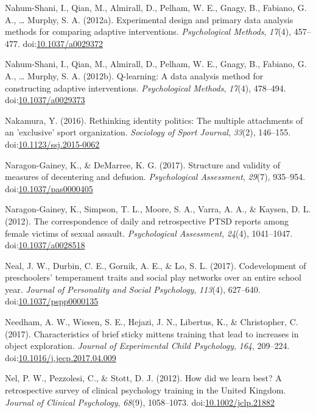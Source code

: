 \documentclass[english,man]{apa6}
\begin{document}
\hypertarget{ref-Nahum-Shani2012a}{}
Nahum-Shani, I., Qian, M., Almirall, D., Pelham, W. E., Gnagy, B.,
Fabiano, G. A., \ldots{} Murphy, S. A. (2012a). Experimental design and
primary data analysis methods for comparing adaptive interventions.
\emph{Psychological Methods}, \emph{17}(4), 457--477.
doi:\href{https://doi.org/10.1037/a0029372}{10.1037/a0029372}

\hypertarget{ref-Nahum-Shani2012}{}
Nahum-Shani, I., Qian, M., Almirall, D., Pelham, W. E., Gnagy, B.,
Fabiano, G. A., \ldots{} Murphy, S. A. (2012b). Q-learning: A data
analysis method for constructing adaptive interventions.
\emph{Psychological Methods}, \emph{17}(4), 478--494.
doi:\href{https://doi.org/10.1037/a0029373}{10.1037/a0029373}

\hypertarget{ref-Nakamura2016}{}
Nakamura, Y. (2016). Rethinking identity politics: The multiple
attachments of an 'exclusive' sport organization. \emph{Sociology of
Sport Journal}, \emph{33}(2), 146--155.
doi:\href{https://doi.org/10.1123/ssj.2015-0062}{10.1123/ssj.2015-0062}

\hypertarget{ref-Naragon-Gainey2017}{}
Naragon-Gainey, K., \& DeMarree, K. G. (2017). Structure and validity of
measures of decentering and defusion. \emph{Psychological Assessment},
\emph{29}(7), 935--954.
doi:\href{https://doi.org/10.1037/pas0000405}{10.1037/pas0000405}

\hypertarget{ref-Naragon-Gainey2012}{}
Naragon-Gainey, K., Simpson, T. L., Moore, S. A., Varra, A. A., \&
Kaysen, D. L. (2012). The correspondence of daily and retrospective PTSD
reports among female victims of sexual assault. \emph{Psychological
Assessment}, \emph{24}(4), 1041--1047.
doi:\href{https://doi.org/10.1037/a0028518}{10.1037/a0028518}

\hypertarget{ref-Neal2017}{}
Neal, J. W., Durbin, C. E., Gornik, A. E., \& Lo, S. L. (2017).
Codevelopment of preschoolers' temperament traits and social play
networks over an entire school year. \emph{Journal of Personality and
Social Psychology}, \emph{113}(4), 627--640.
doi:\href{https://doi.org/10.1037/pspp0000135}{10.1037/pspp0000135}

\hypertarget{ref-Needham2017}{}
Needham, A. W., Wiesen, S. E., Hejazi, J. N., Libertus, K., \&
Christopher, C. (2017). Characteristics of brief sticky mittens training
that lead to increases in object exploration. \emph{Journal of
Experimental Child Psychology}, \emph{164}, 209--224.
doi:\href{https://doi.org/10.1016/j.jecp.2017.04.009}{10.1016/j.jecp.2017.04.009}

\hypertarget{ref-Nel2012}{}
Nel, P. W., Pezzolesi, C., \& Stott, D. J. (2012). How did we learn
best? A retrospective survey of clinical psychology training in the
United Kingdom. \emph{Journal of Clinical Psychology}, \emph{68}(9),
1058--1073.
doi:\href{https://doi.org/10.1002/jclp.21882}{10.1002/jclp.21882}
\end{document}
